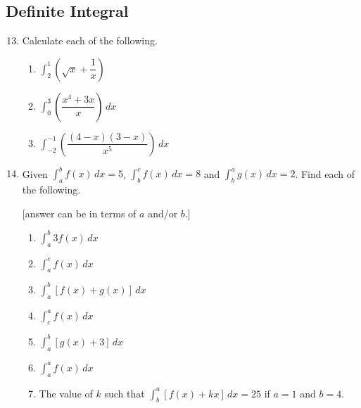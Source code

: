 \documentclass{report}
\begin{document}
\begin{multicols*}{2}
      \section{Definite Integral}
      \begin{enumerate}
            \setcounter{enumi}{12}
            \item Calculate each of the following.
                  \begin{enumerate}
                        \item $\displaystyle \int_{2}^{1}{\left(\sqrt{x} + \dfrac{1}{x}\right)}$
                        \item $\displaystyle \int_{0}^{3}\left(\dfrac{x^4 + 3x}{x}\right)\,dx$
                        \item $\displaystyle \int_{-2}^{-1}\left(\dfrac{(4-x)(3-x)}{x^5}\right)\,dx$
                  \end{enumerate}

            \item Given $\displaystyle \int_{a}^{b}f(x)\,dx = 5$, $\displaystyle
                        \int_{b}^{c}f(x)\,dx = 8$ and $\displaystyle \int_{b}^{a}g(x)\,dx = 2$. Find
                  each of the following.

                        [answer can be in terms of $a$ and/or $b$.]
                  \begin{enumerate}
                        \item $\displaystyle \int_{a}^{b}3f(x)\,dx$
                        \item $\displaystyle \int_{a}^{c}f(x)\,dx$
                        \item $\displaystyle \int_{a}^{b}[f(x) + g(x)]\,dx$
                        \item $\displaystyle \int_{c}^{a}f(x)\,dx$
                        \item $\displaystyle \int_{a}^{b}[g(x) + 3]\,dx$
                        \item $\displaystyle \int_{a}^{a}f(x)\,dx$
                        \item The value of $k$ such that $\displaystyle \int_{b}^{a}[f(x) + kx]\,dx = 25$ if
                              $a = 1$ and $b = 4$.
                  \end{enumerate}


\end{enumerate}
\end{multicols*}
\end{document}
